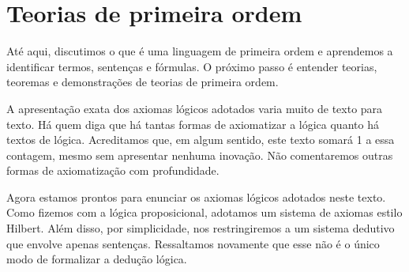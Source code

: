 \section{Teorias de primeira ordem}\label{sec:teoriasPrimeiraOrdem}
Até aqui, discutimos o que é uma linguagem de primeira ordem e aprendemos a identificar termos, sentenças e fórmulas.
O próximo passo é entender teorias, teoremas e demonstrações de teorias de primeira ordem.

A apresentação exata dos axiomas lógicos adotados varia muito de texto para texto.
Há quem diga que há tantas formas de axiomatizar a lógica quanto há textos de lógica.
Acreditamos que, em algum sentido, este texto somará 1 a essa contagem, mesmo sem apresentar nenhuma inovação.
Não comentaremos outras formas de axiomatização com profundidade.

Agora estamos prontos para enunciar os axiomas lógicos adotados neste texto.
Como fizemos com a lógica proposicional, adotamos um sistema de axiomas estilo Hilbert.
Além disso, por simplicidade, nos restringiremos a um sistema dedutivo que envolve apenas sentenças.
Ressaltamos novamente que esse não é o único modo de formalizar a dedução lógica.

